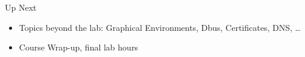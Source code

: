 \documentclass{../lecture}
\begin{document}
\begin{frame}{Up Next}
  \begin{itemize}
    \item Topics beyond the lab: Graphical Environments, Dbus, Certificates,
      DNS, \dots
    \item Course Wrap-up, final lab hours
  \end{itemize}
\end{frame}
\end{document}
